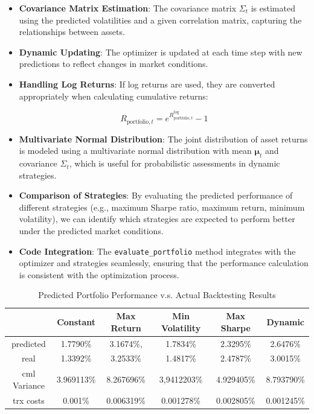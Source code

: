\begin{itemize}
    \item \textbf{Covariance Matrix Estimation}: The covariance matrix \( \Sigma_t \) is estimated using the predicted volatilities and a given correlation matrix, capturing the relationships between assets.

    \item \textbf{Dynamic Updating}: The optimizer is updated at each time step with new predictions to reflect changes in market conditions.

    \item \textbf{Handling Log Returns}: If log returns are used, they are converted appropriately when calculating cumulative returns:

    \[
    R_{\text{portfolio}, t} = e^{R_{\text{portfolio}, t}^{\text{log}}} - 1
    \]

    \item \textbf{Multivariate Normal Distribution}: The joint distribution of asset returns is modeled using a multivariate normal distribution with mean \( \boldsymbol{\mu}_t \) and covariance \( \Sigma_t \), which is useful for probabilistic assessments in dynamic strategies.

    \item \textbf{Comparison of Strategies}: By evaluating the predicted performance of different strategies (e.g., maximum Sharpe ratio, maximum return, minimum volatility), we can identify which strategies are expected to perform better under the predicted market conditions.

    \item \textbf{Code Integration}: The \texttt{evaluate\_portfolio} method integrates with the optimizer and strategies seamlessly, ensuring that the performance calculation is consistent with the optimization process.
\end{itemize}

\begin{table}[htbp]
\centering
\caption{Predicted Portfolio Performance v.s. Actual Backtesting Results}
\label{tab:predicted_vs_actual}
\begin{tabular}{c|ccccc}
\toprule
 &\textbf{Constant} & \textbf{Max Return} & \textbf{Min Volatility} & \textbf{Max Sharpe} & \textbf{Dynamic} \\
\midrule
predicted&1.7790\% & 3.1674\%, & 1.7834\% & 2.3295\% & 2.6476\% \\
real&1.3392\% & 3.2533\% & 1.4817\% & 2.4787\% & 3.0015\% \\
cml Variance& 3.969113\% & 8.267696\% & 3,9412203\% & 4.929405\% & 8.793790\% \\
trx costs&0.001\% & 0.006319\% & 0.001278\% & 0.002805\% & 0.001245\% \\


\bottomrule
\end{tabular}
\end{table}

